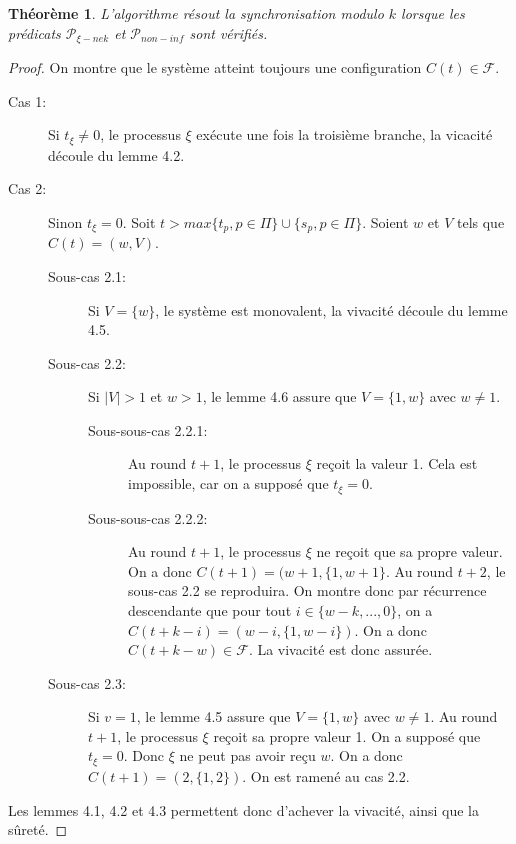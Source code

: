 \documentclass{article}
\newtheorem{theorem}{Théorème}
\begin{document}
\begin{theorem}
	L'algorithme résout la synchronisation modulo $k$ lorsque les prédicats $\mathcal{P}_{\xi-nek}$ et $\mathcal{P}_{non-inf}$ sont vérifiés.
\end{theorem}
\begin{proof}

	On montre que le système atteint toujours une configuration $C(t) \in \mathcal{F}$.

	\begin{description}
		\item[Cas 1:] Si $t_\xi \neq 0$, le processus $\xi$ exécute une fois la troisième branche, la vicacité découle du lemme 4.2.
		\item[Cas 2:] Sinon $t_\xi = 0$. Soit $t > max \{t_p, p \in \Pi\} \cup \{s_p, p \in \Pi\}$. Soient $w$ et $V$ tels que $C(t) = (w, V)$.
			\begin{description}
				\item[Sous-cas 2.1:] Si $V = \{w\}$, le système est monovalent, la vivacité découle du lemme 4.5.
				\item[Sous-cas 2.2:] Si $|V| > 1$ et $w > 1$, le lemme 4.6 assure que $V = \{1, w\}$ avec $w \neq 1$.
					\begin{description}
						\item[Sous-sous-cas 2.2.1:] Au round $t+1$, le processus $\xi$ reçoit la valeur 1. Cela est impossible, car on a supposé que $t_\xi = 0$.
						\item[Sous-sous-cas 2.2.2:] Au round $t+1$, le processus $\xi$ ne reçoit que sa propre valeur. 
							On a donc $C(t+1) = (w+1, \{1, w+1\}$. Au round $t+2$, le sous-cas 2.2 se reproduira.
							On montre donc par récurrence descendante que pour tout $i \in \{w-k, ..., 0\}$,
							on a $C(t+k-i) = (w-i, \{1, w-i\})$. On a donc $C(t+k-w) \in \mathcal{F}$. La vivacité est donc assurée.
					\end{description}
				\item[Sous-cas 2.3:] Si $v = 1$, le lemme 4.5 assure que $V = \{1, w\}$ avec $w \neq 1$.
					Au round $t+1$, le processus $\xi$ reçoit sa propre valeur 1. On a supposé que $t_\xi = 0$. Donc $\xi$ ne peut pas avoir reçu $w$.
					On a donc $C(t+1) = (2, \{1, 2\})$. On est ramené au cas 2.2.
			\end{description}
	\end{description}

	Les lemmes 4.1, 4.2 et 4.3 permettent donc d'achever la vivacité, ainsi que la sûreté.
\end{proof}
\end{document}
